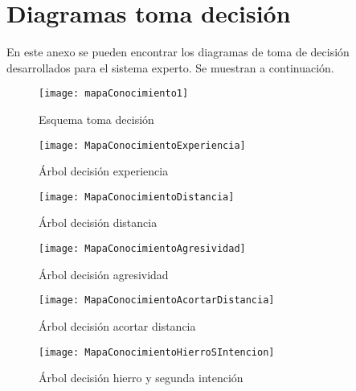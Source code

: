 \chapter{Diagramas toma decisión}
\label{cap:Diagramas toma decisión}

En este anexo se pueden encontrar los diagramas de toma de decisión desarrollados para el sistema
experto. Se muestran a continuación.

\begin{figure}[htb]
  \centering
    \texttt{[image: mapaConocimiento1]}
  \caption[Esquema toma decisión]{Esquema toma decisión}
  \label{fig:Esquema toma decisión}
\end{figure}

\begin{figure}[htb]
  \centering
    \texttt{[image: MapaConocimientoExperiencia]}
  \caption[Árbol decisión experiencia]{Árbol decisión experiencia}
  \label{fig:Arbol decisión experiencia}
\end{figure}

\begin{figure}[htb]
  \centering
    \texttt{[image: MapaConocimientoDistancia]}
  \caption[Árbol decisión distancia]{Árbol decisión distancia}
  \label{fig:Arbol decisión distancia}
\end{figure}


\begin{figure}[htb]
  \centering
    \texttt{[image: MapaConocimientoAgresividad]}
  \caption[Árbol decisión agresividad]{Árbol decisión agresividad}
  \label{fig:Arbol decisión agresividad}
\end{figure}


\begin{figure}[htb]
  \centering
    \texttt{[image: MapaConocimientoAcortarDistancia]}
  \caption[Árbol decisión acortar distancia]{Árbol decisión acortar distancia}
  \label{fig:Arbol decisión acortar distancia}
\end{figure}


\begin{figure}[htb]
  \centering
    \texttt{[image: MapaConocimientoHierroSIntencion]}
  \caption[Árbol decisión hierro y segunda intención]{Árbol decisión hierro y segunda intención}
  \label{fig:Arbol decisión hierro y segunda intención}
\end{figure}
